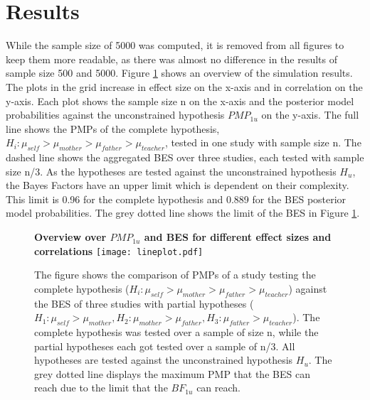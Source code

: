 \documentclass[12pt]{article}
\begin{document}
\section{Results}
While the sample size of 5000 was computed, it is removed from all figures to keep them more readable, as there was almost no difference in the results of sample size 500 and 5000. Figure \ref{fig:lineplot} shows an overview of the simulation results. The plots in the grid increase in effect size on the x-axis and in correlation on the y-axis. Each plot shows the sample size n on the x-axis and the posterior model probabilities against the unconstrained hypothesis $PMP_{1u}$ on the y-axis. The full line shows the PMPs of the complete hypothesis, $H_i: \mu_{self} > \mu_{mother} > \mu_{father} > \mu_{teacher}$, tested in one study with sample size n. The dashed line shows the aggregated BES over three studies, each tested with sample size n/3. As the hypotheses are tested against the unconstrained hypothesis $H_u$, the Bayes Factors have an upper limit which is dependent on their complexity. This limit is 0.96 for the complete hypothesis and 0.889 for the BES posterior model probabilities. The grey dotted line shows the limit of the BES in Figure \ref{fig:lineplot}. \\
\begin{figure}[htbp]
    \centering
    \textbf{Overview over $PMP_{1u}$ and BES for different effect sizes and correlations} %
    \vspace{0.5em}
    \texttt{[image: lineplot.pdf]} 
    \caption{The figure shows the comparison of PMPs of a study testing the complete hypothesis ($H_i: \mu_{self} > \mu_{mother} > \mu_{father} > \mu_{teacher}$) against the BES of three studies with partial hypotheses ($H_1: \mu_{self} > \mu_{mother}, H_2: \mu_{mother} > \mu_{father}, H_3: \mu_{father} > \mu_{teacher}$). The complete hypothesis was tested over a sample of size n, while the partial hypotheses each got tested over a sample of n/3. All hypotheses are tested against the unconstrained hypothesis $H_u$. The grey dotted line displays the maximum PMP that the BES can reach due to the limit that the $BF_{1u}$ can reach.}
    \label{fig:lineplot} %
\end{figure}
\end{document}
